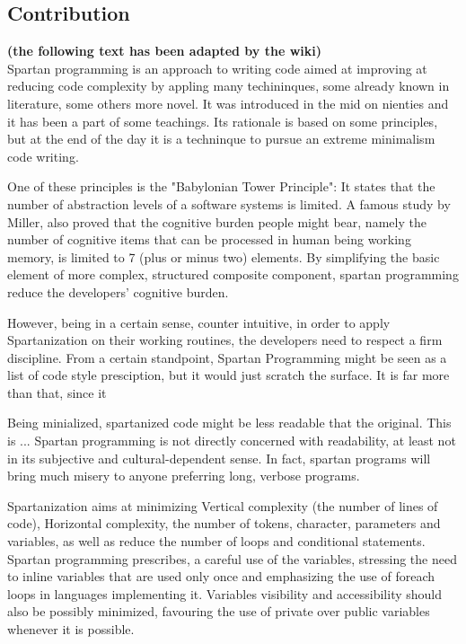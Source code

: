 \subsection{Contribution}

\textbf{(the following text has been adapted by the wiki)}\\

Spartan programming is an approach to writing code aimed at improving at
reducing code complexity by appling many techininques, some already known in
literature, some others more novel. It was introduced in the mid on nienties
and it has been a part of some teachings.  Its rationale is based on some
principles, but at the end of the day it is a techninque to pursue an extreme
minimalism code writing.

One of these principles is the "Babylonian Tower Principle": It states that the
number of abstraction levels of a software systems is limited.  A famous study
by Miller, also proved that the cognitive burden people might bear, namely the
number of cognitive items that can be processed in human being working memory,
is limited to 7 (plus or minus two) elements. By simplifying the basic element
of more complex, structured composite component, spartan programming reduce the
developers' cognitive burden.

However, being in a certain sense, counter intuitive, in order to apply
Spartanization on their working routines, the developers need to respect a firm
discipline.  From a certain standpoint, Spartan Programming might be seen as a
list of code style presciption, but it would just scratch the surface.  It is
far more than that, since it 

Being minialized, spartanized code might be less readable that the original.
This is ...  Spartan programming is not directly concerned with readability, at
least not in its subjective and cultural-dependent sense. In fact, spartan
programs will bring much misery to anyone preferring long, verbose programs.

Spartanization aims at minimizing Vertical complexity (the number of lines of code), 
Horizontal complexity, the number of tokens, character, parameters and variables, 
as well as reduce the number of loops and conditional statements.
Spartan programming prescribes, a careful use of the variables, stressing the need 
to inline variables that are used only once and emphasizing the use of foreach loops 
in languages implementing it. Variables visibility and accessibility should also be 
possibly minimized, favouring the use of private over public variables whenever it 
is possible. 

